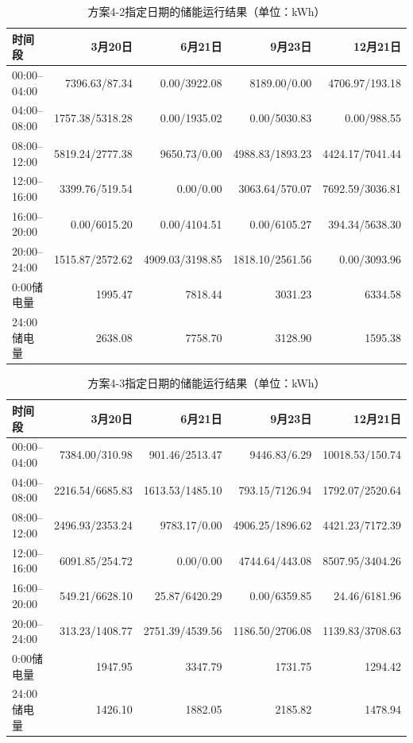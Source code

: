 \begin{table}[H]
\centering\small
\caption{方案4-2指定日期的储能运行结果（单位：kWh）}\label{tab:q4-storage-4-2}
\begin{tabular}{lrrrr}
\toprule
时间段 & 3月20日 & 6月21日 & 9月23日 & 12月21日\\
\midrule
00:00--04:00 & 7396.63/87.34 & 0.00/3922.08 & 8189.00/0.00 & 4706.97/193.18\\
04:00--08:00 & 1757.38/5318.28 & 0.00/1935.02 & 0.00/5030.83 & 0.00/988.55\\
08:00--12:00 & 5819.24/2777.38 & 9650.73/0.00 & 4988.83/1893.23 & 4424.17/7041.44\\
12:00--16:00 & 3399.76/519.54 & 0.00/0.00 & 3063.64/570.07 & 7692.59/3036.81\\
16:00--20:00 & 0.00/6015.20 & 0.00/4104.51 & 0.00/6105.27 & 394.34/5638.30\\
20:00--24:00 & 1515.87/2572.62 & 4909.03/3198.85 & 1818.10/2561.56 & 0.00/3093.96\\
0:00储电量 & 1995.47 & 7818.44 & 3031.23 & 6334.58\\
24:00储电量 & 2638.08 & 7758.70 & 3128.90 & 1595.38\\
\bottomrule
\end{tabular}
\end{table}
\begin{table}[H]
\centering\small
\caption{方案4-3指定日期的储能运行结果（单位：kWh）}\label{tab:q4-storage-4-3}
\begin{tabular}{lrrrr}
\toprule
时间段 & 3月20日 & 6月21日 & 9月23日 & 12月21日\\
\midrule
00:00--04:00 & 7384.00/310.98 & 901.46/2513.47 & 9446.83/6.29 & 10018.53/150.74\\
04:00--08:00 & 2216.54/6685.83 & 1613.53/1485.10 & 793.15/7126.94 & 1792.07/2520.64\\
08:00--12:00 & 2496.93/2353.24 & 9783.17/0.00 & 4906.25/1896.62 & 4421.23/7172.39\\
12:00--16:00 & 6091.85/254.72 & 0.00/0.00 & 4744.64/443.08 & 8507.95/3404.26\\
16:00--20:00 & 549.21/6628.10 & 25.87/6420.29 & 0.00/6359.85 & 24.46/6181.96\\
20:00--24:00 & 313.23/1408.77 & 2751.39/4539.56 & 1186.50/2706.08 & 1139.83/3708.63\\
0:00储电量 & 1947.95 & 3347.79 & 1731.75 & 1294.42\\
24:00储电量 & 1426.10 & 1882.05 & 2185.82 & 1478.94\\
\bottomrule
\end{tabular}
\end{table}
